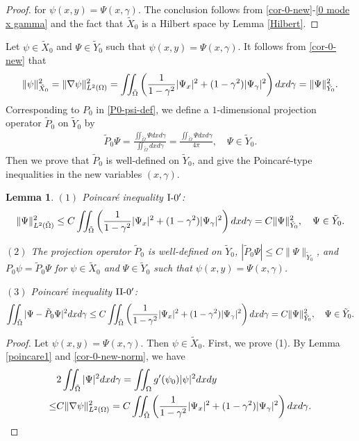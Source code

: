 \documentclass[1 [leqno, 11pt]{amsart}
\numberwithin{equation}{section}
\newtheorem{lemma}[Theorem]{Lemma}
\begin{document}
\begin{CJK*}{GBK}{song}
\begin{proof}
for $\psi(x,y)=\Psi(x,\gamma)$.
The conclusion follows from \eqref{cor-0-new}-\eqref{0 mode x gamma} and  the fact that $\tilde X_0$ is a Hilbert space by Lemma \ref{Hilbert}.
\end{proof}
Let  $\psi \in \tilde{X}_0$ and $\Psi \in \tilde{Y}_0$ such that $\psi(x,y) = \Psi(x, \gamma)$. It follows from \eqref{cor-0-new} that
\begin{align}\label{cor-0-new-norm}
\|\psi\|_{\tilde X_0}^2= \|\nabla \psi\|_{L^2(\Omega)}^2=\iint_{\tilde \Omega}\left({1\over1-\gamma^2}|\Psi_{x}|^2+(1-\gamma^2)|\Psi_{\gamma}|^2\right)d x d\gamma=\|\Psi\|_{\tilde Y_0}^2.
\end{align}
Corresponding to $P_0$ in \eqref{P0-psi-def}, we define a $1$-dimensional projection operator $\tilde P_0$ on $ \tilde{Y}_0$ by
 \begin{align}\label{def-tilde-P0-Psi}
 \tilde P_0\Psi = \frac{\iint_{\tilde\Omega} \Psi dxd\gamma}{\iint_{\tilde\Omega}  dxd\gamma}=\frac{\iint_{\tilde \Omega} \Psi dxd\gamma}{4\pi},\quad \Psi \in \tilde{Y}_0.
 \end{align}
Then we prove that $\tilde P_0$ is well-defined on $ \tilde{Y}_0$, and give the Poincar\'e-type inequalities in the new variables $(x,\gamma)$.
\begin{lemma}\label{Poincare ineqalities-new-variable0}
$(1)$ Poincar\'e inequality $\textup{I-}0'$:
\begin{align*}
\|\Psi\|_{L^2(\tilde\Omega)}^2  \leq C \iint_{\tilde \Omega}\left({1\over1-\gamma^2}|\Psi_{x}|^2+(1-\gamma^2)|\Psi_{\gamma}|^2\right)d x d\gamma=C\|\Psi\|_{\tilde Y_0}^2, \quad \Psi \in \tilde{Y}_0.
\end{align*}

$(2)$ The projection operator $\tilde P_0 $ is well-defined  on $ \tilde{Y}_0$, $|\tilde P_0\Psi|\leq C \|\Psi\|_{\tilde Y_0}$, and $P_0\psi=\tilde P_0\Psi$ for  $\psi \in \tilde{X}_0$ and $\Psi \in \tilde{Y}_0$ such that $\psi(x,y) = \Psi(x, \gamma)$.

$(3)$ Poincar\'e inequality $\textup{II-}0'$:
\begin{align*}
\iint_{\tilde \Omega}|\Psi - \tilde P_0\Psi|^2 dxd\gamma  \leq C \iint_{\tilde \Omega}\left({1\over1-\gamma^2}|\Psi_{x}|^2+(1-\gamma^2)|\Psi_{\gamma}|^2\right)d x d\gamma=C\|\Psi\|_{\tilde Y_0}^2, \quad \Psi \in \tilde{Y}_0.
\end{align*}
\end{lemma}
\begin{proof}  Let $\psi(x,y)=\Psi(x,\gamma)$. Then $\psi\in \tilde {X}_0$. First, we prove (1).
By Lemma  \ref{poincare1} and \eqref{cor-0-new-norm}, we have
\begin{align*}
&2\iint_{\tilde \Omega}|\Psi|^2 dxd\gamma=\iint_\Omega g'(\psi_0)|\psi|^2 dxdy  \\
\leq& C \|\nabla \psi\|_{L^2(\Omega)}^2=C \iint_{\tilde \Omega}\left({1\over1-\gamma^2}|\Psi_{x}|^2+(1-\gamma^2)|\Psi_{\gamma}|^2\right)d x d\gamma.
\end{align*}


\end{proof}
\end{CJK*}
\end{document}
